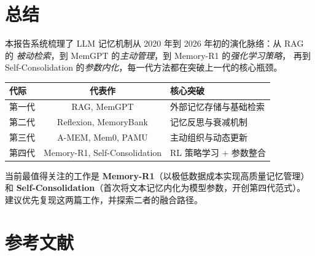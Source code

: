 \documentclass[11pt,a4paper]{article}
\begin{document}
\section{总结}

本报告系统梳理了 LLM 记忆机制从 2020 年到 2026 年初的演化脉络：从 RAG 的
\emph{被动检索}，到 MemGPT 的\emph{主动管理}，到 Memory-R1 的\emph{强化学习策略}，
再到 Self-Consolidation 的\emph{参数内化}，每一代方法都在突破上一代的核心瓶颈。

\begin{center}
\begin{tabular}{lcl}
\toprule
\textbf{代际} & \textbf{代表作} & \textbf{核心突破} \\
\midrule
第一代 & RAG, MemGPT & 外部记忆存储与基础检索 \\
第二代 & Reflexion, MemoryBank & 记忆反思与衰减机制 \\
第三代 & A-MEM, Mem0, PAMU & 主动组织与动态更新 \\
第四代 & Memory-R1, Self-Consolidation & RL 策略学习 + 参数整合 \\
\bottomrule
\end{tabular}
\end{center}

\vspace{1em}
当前最值得关注的工作是 \textbf{Memory-R1}（以极低数据成本实现高质量记忆管理）和
\textbf{Self-Consolidation}（首次将文本记忆内化为模型参数，开创第四代范式）。
建议优先复现这两篇工作，并探索二者的融合路径。

\newpage
\section*{参考文献}

\end{document}
